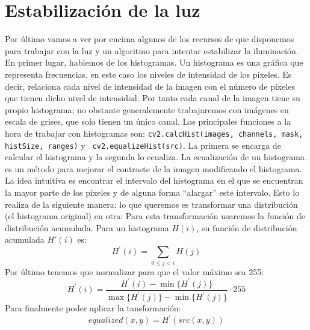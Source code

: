 \documentclass[a4paper,openright, 12pt]{book}
\begin{document}
\chapter{Estabilización de la luz}
Por último vamos a ver por encima algunos de los recursos de que disponemos para trabajar con la luz y un algoritmo para intentar estabilizar la iluminación.
\newline
En primer lugar, hablemos de los histogramas. Un histograma es una gráfica que representa frecuencias, en este caso los niveles de intensidad de los píxeles. Es decir, relaciona cada nivel de intensidad de la imagen con el número de píxeles que tienen dicho nivel de intensidad. Por tanto cada canal de la imagen tiene su propio histograma; no obstante generalemente trabajaremos con imágenes en escala de grises, que solo  tienen un único canal.
\newline
Las principales funciones a la hora de trabajar con histogramas son:
\newline
\lstinline|cv2.calcHist(images, channels, mask, histSize, ranges)| y
\newline \lstinline| cv2.equalizeHist(src)|.
La primera se encarga de calcular el histograma y la segunda lo ecualiza.
\newline 
La ecualización de un histograma es un método para mejorar el contraste de la imagen modificando el histograma. La idea intuitiva es encontrar el intervalo del histograma en el que se encuentran la mayor parte de los píxeles y de alguna forma ``alargar'' este intervalo. Esto lo realiza de la siguiente manera: lo que queremos es transformar una distribución (el histograma original) en otra: Para esta transformación usaremos la función de distribución acumulada. Para un histograma $H(i)$, su función de distribución acumulada $H'(i)$ es:
\begin{equation*}
H^{'}(i) = \sum_{0 \le j < i} H(j)
\end{equation*}
Por último tenemos que normalizar para que el valor máximo sea 255:
\begin{equation*}
H^{'}(i) =\frac{H^{'}(i) - \min\{H^{'}(j)\}} {\max\{H^{'}(j)\}-\min\{H^{'}(j)\}} \cdot255
\end{equation*}
Para finalmente poder aplicar la tansformación:
\begin{equation*}
equalized( x, y ) = H^{'}( src(x,y) )
\end{equation*}
\end{document}
